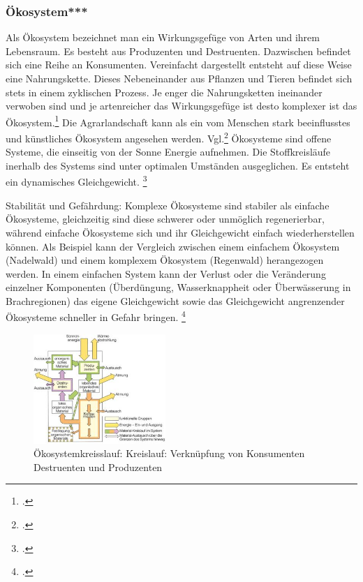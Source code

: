 \documentclass{scrartcl}
\begin{document}
\subsubsection{Ökosystem***}
Als Ökosystem bezeichnet man ein Wirkungsgefüge von Arten und ihrem Lebensraum. Es besteht aus Produzenten und Destruenten. Dazwischen befindet sich eine Reihe an Konsumenten. Vereinfacht dargestellt entsteht auf diese Weise eine Nahrungskette. Dieses Nebeneinander aus Pflanzen und Tieren befindet sich stets in einem zyklischen Prozess. Je enger die Nahrungsketten ineinander verwoben sind und je artenreicher das Wirkungsgefüge ist desto komplexer ist das Ökosystem.\footcite{NachhaltigeBrockhaus.de} Die Agrarlandschaft kann als ein vom Menschen stark beeinflusstes und künstliches Ökosystem angesehen werden. Vgl.\footcite{BrockhausOkosystem}
Ökosysteme sind offene Systeme, die einseitig von der Sonne Energie aufnehmen. Die Stoffkreisläufe inerhalb des Systems sind unter optimalen Umständen ausgeglichen. Es entsteht ein dynamisches Gleichgewicht. \footcite{BrockhausOkosystem}

\hfill \break
Stabilität und Gefährdung: Komplexe Ökosysteme sind stabiler als einfache Ökosysteme, gleichzeitig sind diese schwerer oder unmöglich regenerierbar, während einfache Ökosysteme sich und ihr Gleichgewicht einfach wiederherstellen können. Als Beispiel kann der Vergleich zwischen einem einfachem Ökosystem (Nadelwald) und einem komplexem Ökosystem (Regenwald) herangezogen werden.
In einem einfachen System kann der Verlust oder die Veränderung einzelner Komponenten (Überdüngung, Wasserknappheit oder Überwässerung in Brachregionen) das eigene Gleichgewicht sowie das Gleichgewicht angrenzender Ökosysteme schneller in Gefahr bringen. \footcite{DefinitionWirtschaftslexikone}

\begin{figure}[htbp]
\centering
\includegraphics[width=5cm]{image_folder/oekosystemkreisslauf.png}
\caption{Ökosystemkreisslauf: Kreislauf: Verknüpfung von Konsumenten Destruenten und Produzenten}
\label{fig:Ökosystemkreisslauf}
\end{figure}
\end{document}
